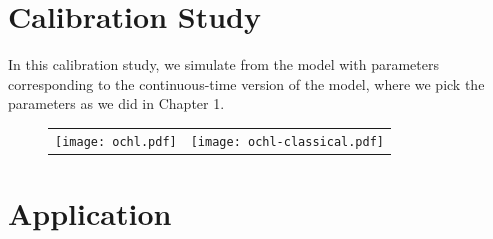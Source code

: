 \documentclass[10pt]{article}
\begin{document}
\section{Calibration Study}
In this calibration study, we simulate from the model with parameters
corresponding to the continuous-time version of the model, where we
pick the parameters as we did in Chapter 1.

\begin{figure}
  \begin{tabular}{cc}
    \begin{minipage}{0.45\textwidth}
      \centering
      \texttt{[image: ochl.pdf]}
    \end{minipage}
    & \begin{minipage}{0.45\textwidth}
      \centering
      \texttt{[image: ochl-classical.pdf]}
    \end{minipage}    
  \end{tabular}
\end{figure}

\section{Application}



\end{document}
